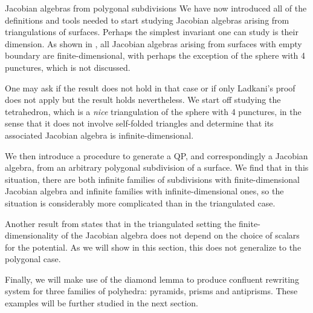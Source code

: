 \begin{chapter}{Jacobian algebras from polygonal subdivisions}
We have now introduced all of the definitions and tools needed to start studying Jacobian algebras arising from triangulations of surfaces. Perhaps the simplest invariant one can study is their dimension. As shown in \cite{Lad12}, all Jacobian algebras arising from surfaces with empty boundary are finite-dimensional, with perhaps the exception of the sphere with 4 punctures, which is not discussed. 

One may ask if the result does not hold in that case or if only Ladkani's proof does not apply but the result holds nevertheless. We start off studying the tetrahedron, which is a \emph{nice} triangulation of the sphere with 4 punctures, in the sense that it does not involve self-folded triangles and determine that its associated Jacobian algebra is infinite-dimensional.

We then introduce a procedure to generate a QP, and correspondingly a Jacobian algebra, from an arbitrary polygonal subdivision of a surface. We find that in this situation, there are both infinite families of subdivisions with finite-dimensional Jacobian algebra and infinite families with infinite-dimensional ones, so the situation is considerably more complicated than in the triangulated case.

Another result from \cite{Lad12} states that in the triangulated setting the finite-dimensionality of the Jacobian algebra does not depend on the choice of scalars for the potential. As we will show in this section, this does not generalize to the polygonal case.

Finally, we will make use of the diamond lemma to produce confluent rewriting system for three families of polyhedra: pyramids, prisms and antiprisms. These examples will be further studied in the next section.


\end{chapter}
